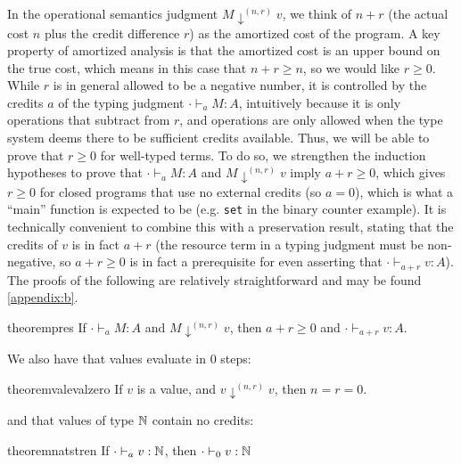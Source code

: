 In the operational semantics judgment $M \downarrow^{(n,r)} v$, we
think of $n + r$ (the actual cost $n$ plus the credit difference $r$) as
the amortized cost of the program.  A key property of amortized analysis
is that the amortized cost is an upper bound on the true cost, which
means in this case that $n + r \ge n$, so we would like $r \ge 0$.
While $r$ is in general allowed to be a negative number, it is
controlled by the credits $a$ of the typing judgment $\cdot \vdash_a M
: A$, intuitively because it is only \discname\/ operations that
subtract from $r$, and \discname\/ operations are only allowed when the
type system deems there to be sufficient credits available.  Thus, we
will be able to prove that $r \ge 0$ for well-typed terms.  To do so,
we strengthen the induction hypotheses to prove that $\cdot \vdash_a M :
A$ and $M \downarrow^{(n,r)} v$ imply $a + r \geq 0$, which gives $r
\geq 0$ for closed programs that use no external credits (so $a = 0$),
which is what a ``main'' function is expected to be (e.g. \texttt{set}
in the binary counter example).  It is technically convenient to combine
this with a preservation result, stating that the credits of $v$ is in
fact $a + r$ (the resource term in a typing judgment must be
non-negative, so $a + r \geq 0$ is in fact a prerequisite for even
asserting that $\cdot \vdash_{a+r} v : A$).  The proofs of the following are
relatively straightforward and may be found
\autoref{appendix:b}.%


\begin{restatable}{theorem}{pres}
\label{thm:pres}
If $\cdot \vdash_a M : A$ and $M \downarrow^{(n,r)} v$, then $a + r \geq 0$ and $\cdot \vdash_{a + r} v : A$. 
\end{restatable}

We also have that values evaluate in 0 steps:
\begin{restatable}[]{theorem}{valevalzero}\label{thm:val-eval-none}
If $v$ is a value, and $v \downarrow^{(n,r)} v$, then $n = r = 0$.
\end{restatable}

and that values of type $\mathbb{N}$ contain no credits:
\begin{restatable}{theorem}{natstren}\label{thm:nat-strengthening}
If $\cdot \vdash_a v : \mathbb{N}$, then $\cdot \vdash_0 v : \mathbb{N}$
\end{restatable}



